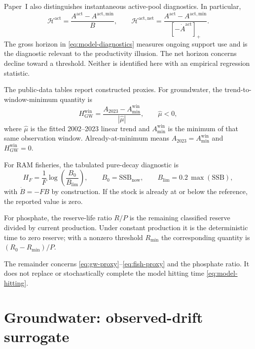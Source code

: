\documentclass[11pt]{article}
\theoremstyle{definition}
\begin{document}
Paper~I also distinguishes instantaneous active-pool diagnostics. In particular,
\begin{equation}
\mathcal H^{\mathrm{act}}=\frac{A^{\mathrm{act}}-A^{\mathrm{act,min}}}{B},
\qquad
\mathcal H^{\mathrm{act,net}}=
\frac{A^{\mathrm{act}}-A^{\mathrm{act,min}}}{[-\dot A^{\mathrm{act}}]_+}.
\label{eq:model-diagnostics}
\end{equation}
The gross horizon in \eqref{eq:model-diagnostics} measures ongoing support use and is the diagnostic relevant to the productivity illusion. The net horizon concerns decline toward a threshold. Neither is identified here with an empirical regression statistic.

The public-data tables report constructed proxies. For groundwater, the trend-to-window-minimum quantity is
\begin{equation}
H_{\mathrm{GW}}^{\mathrm{win}}
=\frac{A_{2023}-A_{\min}^{\mathrm{win}}}{|\widehat\mu|},
\qquad \widehat\mu<0,
\label{eq:gw-proxy}
\end{equation}
where $\widehat\mu$ is the fitted 2002--2023 linear trend and $A_{\min}^{\mathrm{win}}$ is the minimum of that same observation window. Already-at-minimum means $A_{2023}=A_{\min}^{\mathrm{win}}$ and $H_{\mathrm{GW}}^{\mathrm{win}}=0$.

For RAM fisheries, the tabulated pure-decay diagnostic is
\begin{equation}
H_F=\frac{1}{F}\log\left(\frac{B_0}{B_{\mathrm{lim}}}\right),
\qquad B_0=\mathrm{SSB}_{\mathrm{now}},
\qquad B_{\mathrm{lim}}=0.2\,\max(\mathrm{SSB}),
\label{eq:fish-proxy}
\end{equation}
with $\dot B=-FB$ by construction. If the stock is already at or below the reference, the reported value is zero.

For phosphate, the reserve-life ratio $R/P$ is the remaining classified reserve divided by current production. Under constant production it is the deterministic time to zero reserve; with a nonzero threshold $R_{\min}$ the corresponding quantity is $(R_0-R_{\min})/P$.

The remainder concerns \eqref{eq:gw-proxy}--\eqref{eq:fish-proxy} and the phosphate ratio. It does not replace or stochastically complete the model hitting time \eqref{eq:model-hitting}.

\section{Groundwater: observed-drift surrogate}
\label{sec:groundwater}
\end{document}
